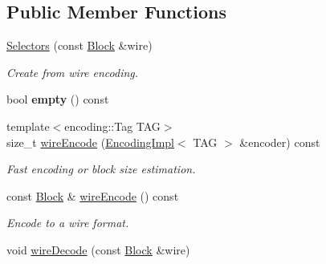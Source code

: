 \subsection*{Public Member Functions}
\begin{DoxyCompactItemize}
\item 
\hyperlink{classndn_1_1Selectors_af1a9d2e19a33dbb677ca7a4c8fe547b8}{Selectors} (const \hyperlink{classndn_1_1Block}{Block} \&wire)\hypertarget{classndn_1_1Selectors_af1a9d2e19a33dbb677ca7a4c8fe547b8}{}\label{classndn_1_1Selectors_af1a9d2e19a33dbb677ca7a4c8fe547b8}

\begin{DoxyCompactList}\small\item\em Create from wire encoding. \end{DoxyCompactList}\item 
bool {\bfseries empty} () const\hypertarget{classndn_1_1Selectors_acc440b11a53126c7ae1a9b4f38439a84}{}\label{classndn_1_1Selectors_acc440b11a53126c7ae1a9b4f38439a84}

\item 
{\footnotesize template$<$encoding\+::\+Tag T\+AG$>$ }\\size\+\_\+t \hyperlink{classndn_1_1Selectors_add0b547f0ce130b1b7b23ef3f4592aa7}{wire\+Encode} (\hyperlink{classndn_1_1encoding_1_1EncodingImpl}{Encoding\+Impl}$<$ T\+AG $>$ \&encoder) const\hypertarget{classndn_1_1Selectors_add0b547f0ce130b1b7b23ef3f4592aa7}{}\label{classndn_1_1Selectors_add0b547f0ce130b1b7b23ef3f4592aa7}

\begin{DoxyCompactList}\small\item\em Fast encoding or block size estimation. \end{DoxyCompactList}\item 
const \hyperlink{classndn_1_1Block}{Block} \& \hyperlink{classndn_1_1Selectors_ab88f62d352d106b496b48b763afda743}{wire\+Encode} () const\hypertarget{classndn_1_1Selectors_ab88f62d352d106b496b48b763afda743}{}\label{classndn_1_1Selectors_ab88f62d352d106b496b48b763afda743}

\begin{DoxyCompactList}\small\item\em Encode to a wire format. \end{DoxyCompactList}\item 
void \hyperlink{classndn_1_1Selectors_a8d28bc216edbe27d42b9dca9a460d97d}{wire\+Decode} (const \hyperlink{classndn_1_1Block}{Block} \&wire)\hypertarget{classndn_1_1Selectors_a8d28bc216edbe27d42b9dca9a460d97d}{}\label{classndn_1_1Selectors_a8d28bc216edbe27d42b9dca9a460d97d}


\end{DoxyCompactItemize}
